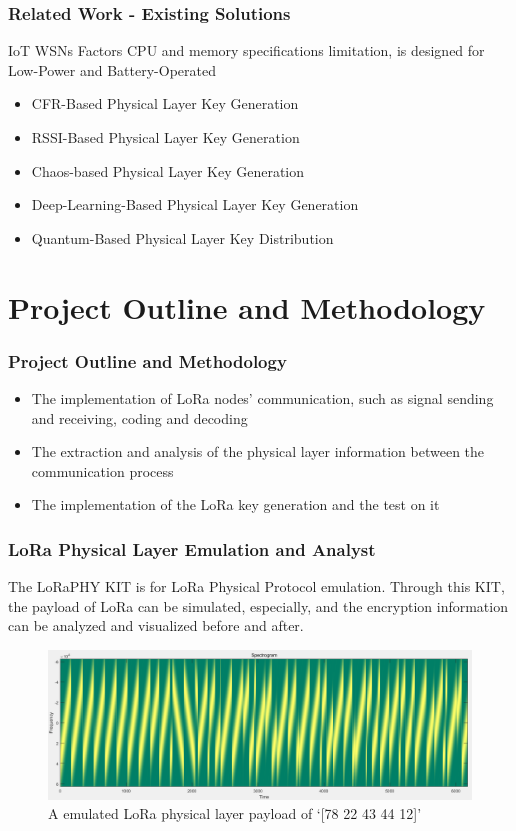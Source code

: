 \documentclass{beamer}
\begin{document}
\begin{frame}
  \frametitle{Related Work - Existing Solutions}

  \begin{block}{IoT WSNs Factors}
    CPU and memory specifications limitation, is designed for Low-Power and Battery-Operated
  \end{block}
  
  \begin{itemize}
    \item CFR-Based Physical Layer Key Generation
    \item \alert{RSSI-Based Physical Layer Key Generation}
    \item Chaos-based Physical Layer Key Generation
    \item Deep-Learning-Based Physical Layer Key Generation
    \item Quantum-Based Physical Layer Key Distribution
\end{itemize}
\end{frame}


\section{Project Outline and Methodology}

\begin{frame}
  \frametitle{Project Outline and Methodology}
  \begin{itemize}
    \item The implementation of LoRa nodes’ communication, such as signal sending and receiving, coding and decoding
    \item The extraction and analysis of the physical layer information between the communication process
    \item The implementation of the LoRa key generation and the test on it
    \end{itemize}
\end{frame}

\begin{frame}
  \frametitle{LoRa Physical Layer Emulation and Analyst}
  The LoRaPHY KIT is for LoRa Physical Protocol emulation\cite{10.1145/3546869}. Through this KIT, the payload of LoRa can be simulated, especially, and the encryption information can be analyzed and visualized before and after.
\begin{figure}
  \centering
  \includegraphics[width=0.8\linewidth]{../figures/fig3-1.png}
  \caption{A emulated LoRa physical layer payload of ‘[78 22 43 44 12]’}
  \label{fig:3-1}
\end{figure}
\end{frame}
\end{document}
